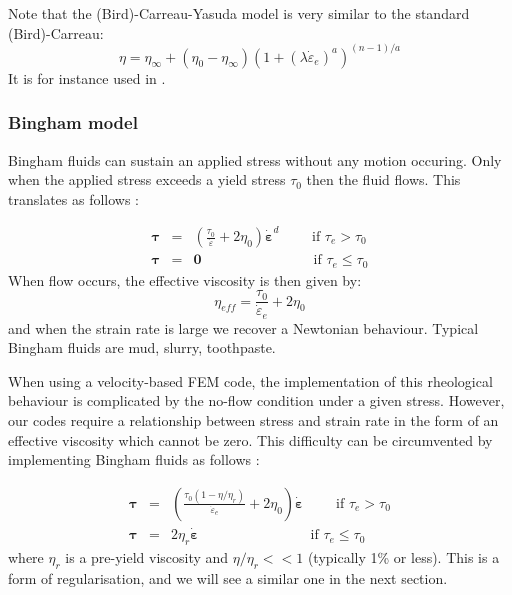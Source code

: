 Note that the (Bird)-Carreau-Yasuda model \cite{osru14} is very similar to the standard (Bird)-Carreau:
\begin{equation}
\eta = \eta_\infty + (\eta_0-\eta_\infty) \left(1 + (\lambda \dot{\varepsilon}_{e})^a \right)^{(n-1)/a}
\end{equation}
It is for instance used in \cite{vadv03}.

\Literature \cite{berc95,marc00}

\subsubsection{Bingham model} \label{sec:bingham}

Bingham fluids can sustain an applied stress without any motion occuring. Only when the applied stress exceeds
a yield stress $\tau_0$ then the fluid flows. This translates as follows \cite{reddybook2}:

\begin{eqnarray}
{\bm \tau} &=& \left(  \frac{\tau_0}{\dot{\varepsilon}} + 2 \eta_0  \right)\dot{\bm \varepsilon}^d \qquad 
\text{ if } {\tau}_{e}>\tau_0 \\
{\bm \tau} &=& {\bm 0} \qquad\qquad\qquad\qquad  \text{if } \tau_{e} \leq \tau_0 
\end{eqnarray}
When flow occurs, the effective viscosity is then given by:
\[
\eta_{eff} =  \frac{\tau_0}{\dot{\varepsilon}_e} + 2 \eta_0 
\]
and when the strain rate is large we recover a Newtonian behaviour.
Typical Bingham fluids are mud, slurry, toothpaste.  

When using a velocity-based FEM code, the implementation of this rheological behaviour 
is complicated by the no-flow condition under a given stress. However, our codes
require a relationship between stress and strain rate in the form of an effective viscosity
which cannot be zero. 
This difficulty can be circumvented by implementing Bingham fluids as follows \cite{reddybook2}:

\begin{eqnarray}
{\bm \tau} &=& \left(  \frac{\tau_0(1-\eta/\eta_r)}{\dot{\varepsilon}_e} 
+ 2 \eta_0  \right)\dot{\bm \varepsilon} \qquad \text{ if } \tau_{e}>\tau_0 \\
{\bm \tau} &=& 2 \eta_r \dot{\bm \varepsilon}  \qquad\qquad\qquad\qquad  
\text{if } \tau_{e} \leq \tau_0 
\end{eqnarray}
where $\eta_r$ is a pre-yield viscosity and $\eta/\eta_r<<1$ (typically 1\% or less). This is a form of 
regularisation, and we will see a similar one in the next section.

